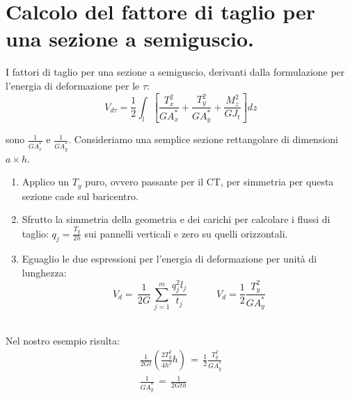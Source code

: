 \section{Calcolo del fattore di taglio per una sezione a semiguscio.}

I fattori di taglio per una sezione a semiguscio, derivanti dalla formulazione per l'energia di deformazione per le $\tau$:
\begin{equation*}
    V_{d\tau}= \frac{1}{2} \int_l 
    \left[
        \frac{T_x^2}{G A^*_x} 
        + \frac{T_y^2}{G A^*_y} 
        + \frac{M_z^2}{G J_t}
    \right] dz
\end{equation*}

sono $ \frac{1}{G A^*_x} $ e $\frac{1}{G A^*_y} $. Consideriamo una semplice sezione rettangolare di dimensioni $a\times h$.
\begin{enumerate}
    \item Applico un $T_y$ puro, ovvero passante per il CT, per simmetria per questa sezione cade sul baricentro.\\
    \item Sfrutto la simmetria della geometria e dei carichi per calcolare i flussi di taglio: $q_j=\frac{T_y}{2h}$ sui pannelli verticali e zero su quelli orizzontali.\\
    \item Eguaglio le due espressioni per l'energia di deformazione per unità di lunghezza:
        \begin{equation*}
            V_d   =\, \frac{1}{2G} \,\sum^m_{j=1}\frac{q_j^2l_j}{t_j}
            \quad\quad\quad
             V_{d}= \frac{1}{2} \frac{T_y^2}{G A^*_y} 
        \end{equation*}\\
\end{enumerate}

Nel nostro esempio risulta:
\begin{align*}
    \frac{1}{2Gt} \left( \frac{2T_y^2}{4h^2}h \right)\,=\,\frac{1}{2} \frac{T_y^2}{G A^*_y} \\
     \frac{1}{G A^*_y}\,=\,  \frac{1}{2G th}
\end{align*}